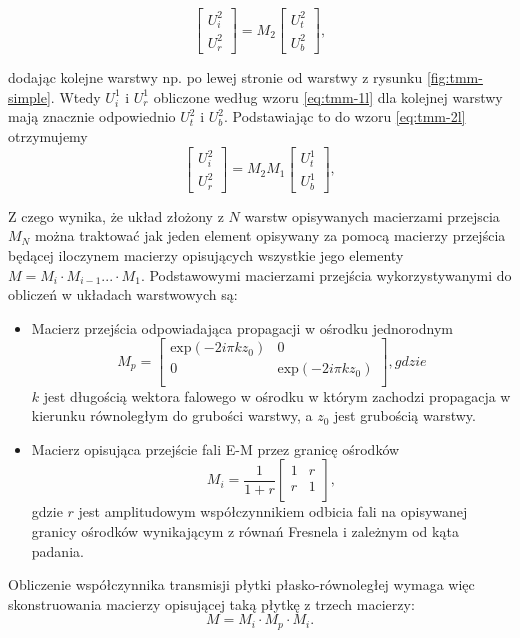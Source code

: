 \begin{equation}
	\begin{bmatrix}
	U_i^2 \\ 
	U_r^2
	\end{bmatrix}
	= M_2 
	\begin{bmatrix}
	U_t^2 \\
	U_b^2
	\end{bmatrix},
\label{eq:tmm-2l}
\end{equation}

dodając kolejne warstwy np. po lewej stronie od warstwy z rysunku \ref{fig:tmm-simple}. Wtedy $U_i^1$ i $U_r^1$ obliczone według wzoru \ref{eq:tmm-1l} dla kolejnej warstwy mają znacznie odpowiednio $U_t^2$ i $U_b^2$. Podstawiając to do wzoru \ref{eq:tmm-2l} otrzymujemy 
\begin{equation}
\begin{bmatrix}
U_i^2 \\ 
U_r^2
\end{bmatrix}
=M_2 M_1 
\begin{bmatrix}
U_t^1 \\
U_b^1
\end{bmatrix},
\label{eq:tmm-2ls}
\end{equation}

Z czego wynika, że układ złożony z $N$ warstw opisywanych macierzami przejscia $M_N$ można traktować jak jeden element opisywany za pomocą macierzy przejścia będącej iloczynem macierzy opisujących wszystkie jego elementy $M= M_i \cdot M_{i-1} ... \cdot M_1$. Podstawowymi macierzami przejścia wykorzystywanymi do obliczeń w układach warstwowych są:
\begin{itemize}
\item Macierz przejścia odpowiadająca propagacji w ośrodku jednorodnym 
\begin{equation}
	M_p=
	\begin{bmatrix}
	\textrm{exp}(-2i\pi k z_0) & 0 \\
	0	&\textrm{exp}(-2i\pi k z_0)\\
	\end{bmatrix},gdzie
\end{equation}
$k$ jest długością wektora falowego w ośrodku w którym zachodzi propagacja w kierunku równoległym do grubości warstwy, a $z_0$ jest grubością warstwy.
\item Macierz opisująca przejście fali E-M przez granicę ośrodków
\begin{equation}
	M_i=\frac{1}{1+r}
	\begin{bmatrix}
	1 & r \\
	r & 1\\
	\end{bmatrix},
\end{equation}
gdzie $r$ jest amplitudowym współczynnikiem odbicia fali na opisywanej granicy ośrodków wynikającym z równań Fresnela i zależnym od kąta padania. 
\end{itemize}

Obliczenie współczynnika transmisji płytki płasko-równoległej wymaga więc skonstruowania macierzy opisującej taką płytkę z trzech macierzy: 
\[
M=M_i \cdot M_p \cdot  M_i.
\]
